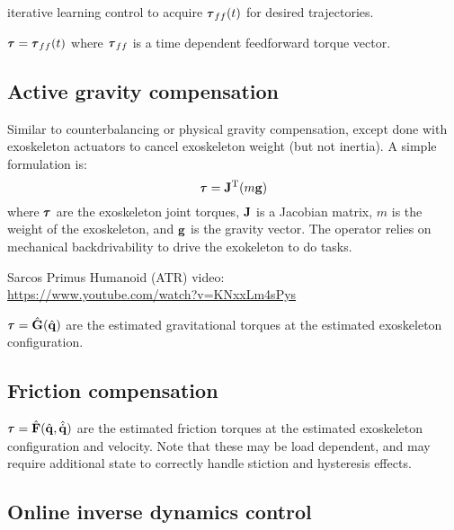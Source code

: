 \documentclass[letterpaper,12pt,fullpage]{article}
\begin{document}
iterative learning control to acquire $\vtau_{ff}(t)$ for desired trajectories.

$\vtau = \vtau_{ff}(t)$ where $\vtau_{ff}$ is a time
dependent feedforward torque vector.

\subsection{Active gravity compensation}

Similar to counterbalancing or physical gravity compensation, except done
with exoskeleton actuators to cancel exoskeleton weight (but not inertia).
A simple formulation is:
\begin{equation}
\vtau = \mJ^{\tr} (m\vg)
\end{equation}
where $\vtau$ are the exoskeleton joint torques, 
${\bf J}$ is a Jacobian matrix, $m$ is the weight of the exoskeleton,
and ${\bf g}$ is the gravity vector. 
The operator relies on mechanical backdrivability to drive
the exokeleton to do tasks.

Sarcos Primus Humanoid (ATR) video:\\
\url{https://www.youtube.com/watch?v=KNxxLm4sPys}

$\vtau = \hat{\mG}(\hat{\vq})$ 
are the estimated gravitational torques at the estimated exoskeleton configuration.

\subsection{Friction compensation}

$\vtau = \hat{\mF}(\hat{\vq},\hat{\dot{\vq}})$ 
are the estimated friction torques at the estimated exoskeleton configuration
and velocity.
Note that these may be load dependent, and may require additional state to
correctly handle stiction and hysteresis effects.

\subsection{Online inverse dynamics control}
\end{document}
